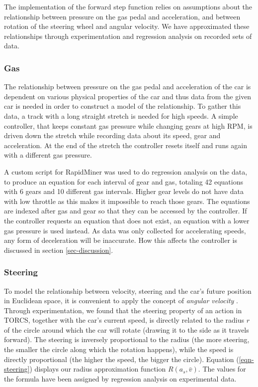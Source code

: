 \documentclass[conference]{IEEEtran}
\begin{document}
The implementation of the forward step function relies on assumptions about the relationship between pressure on the gas pedal and acceleration, and between rotation of the steering wheel and angular velocity. We have approximated these relationships through experimentation and regression analysis on recorded sets of data.

\subsubsection{Gas}
The relationship between pressure on the gas pedal and acceleration of the car is dependent on various physical properties of the car and thus data from the given car is needed in order to construct a model of the relationship. To gather this data, a track with a long straight stretch is needed for high speeds. A simple controller, that keeps constant gas pressure while changing gears at high RPM, is driven down the stretch while recording data about its speed, gear and acceleration. At the end of the stretch the controller resets itself and runs again with a different gas pressure.

A custom script for RapidMiner \cite{rapidminer} was used to do regression analysis on the data, to produce an equation for each interval of gear and gas, totaling 42 equations with 6 gears and 10 different gas intervals. Higher gear levels do not have data with low throttle as this makes it impossible to reach those gears. The equations are indexed after gas and gear so that they can be accessed by the controller. If the controller requests an equation that does not exist, an equation with a lower gas pressure is used instead. As data was only collected for accelerating speeds, any form of deceleration will be inaccurate. How this affects the controller is discussed in section \ref{sec-discussion}.

\subsubsection{Steering}
To model the relationship between velocity, steering and the car's future position in Euclidean space, it is convenient to apply the concept of \emph{angular velocity} \cite{angv}\cite{rotq}. Through experimentation, we found that the steering property of an action in TORCS, together with the car's current speed, is directly related to the radius $r$ of the circle around which the car will rotate (drawing it to the side as it travels forward). The steering is inversely proportional to the radius (the more steering, the smaller the circle along which the rotation happens), while the speed is directly proportional (the higher the speed, the bigger the circle). Equation (\ref{eqn-steering}) displays our radius approximation function $R(a_s,\bar{v})$. The values for the formula have been assigned by regression analysis on experimental data.
\end{document}
